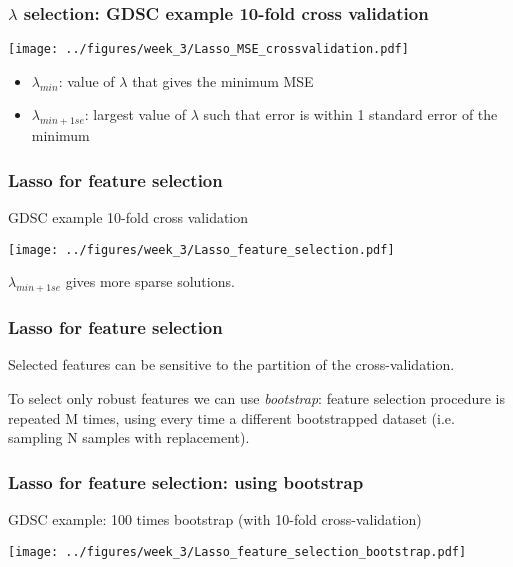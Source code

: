 \documentclass[notes]{beamer}          %
\begin{document}
\begin{frame}
\frametitle{$\lambda$ selection: GDSC example 10-fold cross validation}

\begin{center}
\texttt{[image: ../figures/week\_3/Lasso\_MSE\_crossvalidation.pdf]}
\end{center}

\vspace{-2mm} 

\begin{itemize}
    \item $\lambda_{min}$: value of $\lambda$ that gives the minimum MSE
    \item $\lambda_{min+1se}$: largest value of $\lambda$ such that error is within 1 standard error of the minimum
\end{itemize}

\end{frame}

\begin{frame}
\frametitle{Lasso for feature selection}
GDSC example 10-fold cross validation

\begin{center}
\texttt{[image: ../figures/week\_3/Lasso\_feature\_selection.pdf]}
\end{center}

$\lambda_{min+1se}$ gives more sparse solutions.

\end{frame}


\begin{frame}
\frametitle{Lasso for feature selection}

Selected features can be sensitive to the partition of the cross-validation.

\vspace{5mm} 

To select only robust features we can use \textit{bootstrap}: feature selection procedure is repeated M times, using every time a different bootstrapped dataset (i.e. sampling N samples with replacement).

\end{frame}


\begin{frame}
\frametitle{Lasso for feature selection: using bootstrap}
GDSC example: 100 times bootstrap (with 10-fold cross-validation)

\begin{center}
\texttt{[image: ../figures/week\_3/Lasso\_feature\_selection\_bootstrap.pdf]}
\end{center}

\end{frame}
\end{document}
